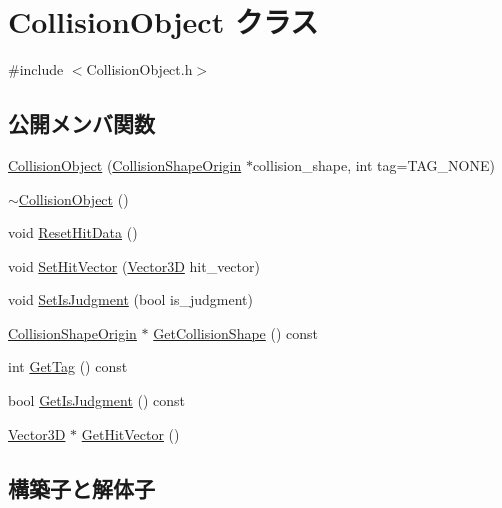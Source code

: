 \hypertarget{class_collision_object}{}\section{Collision\+Object クラス}
\label{class_collision_object}


{\ttfamily \#include $<$Collision\+Object.\+h$>$}

\subsection*{公開メンバ関数}
\begin{DoxyCompactItemize}
\item 
\mbox{\hyperlink{class_collision_object_aab884f4103bb369b503f5e937c7c2451}{Collision\+Object}} (\mbox{\hyperlink{class_collision_shape_origin}{Collision\+Shape\+Origin}} $\ast$collision\+\_\+shape, int tag=T\+A\+G\+\_\+\+N\+O\+NE)
\item 
\mbox{\hyperlink{class_collision_object_a8c4e6916bc5911b8a82498536d5a27e1}{$\sim$\+Collision\+Object}} ()
\item 
void \mbox{\hyperlink{class_collision_object_a92dd5d21c6674605d290e0d37d64505a}{Reset\+Hit\+Data}} ()
\item 
void \mbox{\hyperlink{class_collision_object_acd9790e26ebd136bf4ad3dd4eb56c881}{Set\+Hit\+Vector}} (\mbox{\hyperlink{class_vector3_d}{Vector3D}} hit\+\_\+vector)
\item 
void \mbox{\hyperlink{class_collision_object_a22b0732ec2a005fe03991ae528c82f4c}{Set\+Is\+Judgment}} (bool is\+\_\+judgment)
\item 
\mbox{\hyperlink{class_collision_shape_origin}{Collision\+Shape\+Origin}} $\ast$ \mbox{\hyperlink{class_collision_object_a91922573ea16575f5a8896f77efe9957}{Get\+Collision\+Shape}} () const
\item 
int \mbox{\hyperlink{class_collision_object_a3d81adc726fd092fcd26efb4ddfcfd99}{Get\+Tag}} () const
\item 
bool \mbox{\hyperlink{class_collision_object_ac923c4826d5b48f91fc93942e70b097d}{Get\+Is\+Judgment}} () const
\item 
\mbox{\hyperlink{class_vector3_d}{Vector3D}} $\ast$ \mbox{\hyperlink{class_collision_object_a0ad360e1a97a318cbfdf84be6f84dbcc}{Get\+Hit\+Vector}} ()
\end{DoxyCompactItemize}


\subsection{構築子と解体子}
\mbox{\label{class_collision_object_aab884f4103bb369b503f5e937c7c2451}} 
